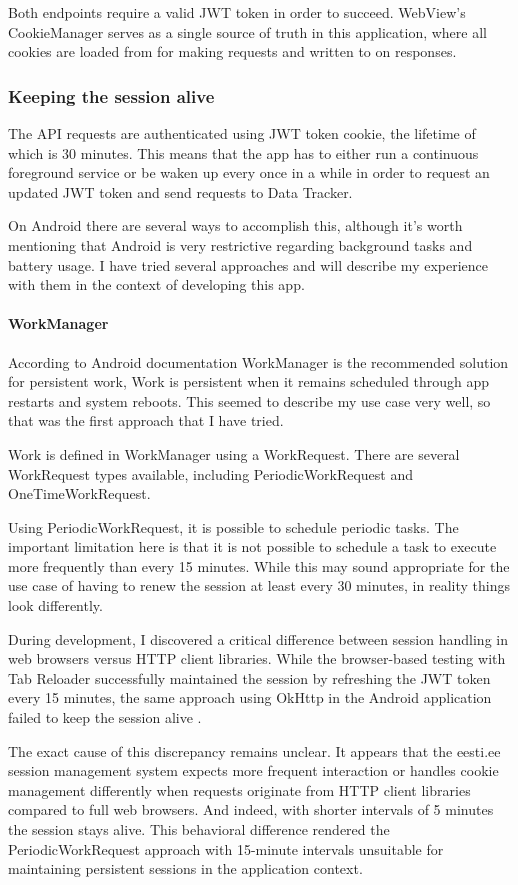 Both endpoints require a valid JWT token in order to succeed. WebView's CookieManager serves as a single source of truth in this application, where all cookies are loaded from for making requests and written to on responses.

\subsubsection{Keeping the session alive}
The API requests are authenticated using JWT token cookie, the lifetime of which is 30 minutes. This means that the app has to either run a continuous foreground service or be waken up every once in a while in order to request an updated JWT token and send requests to Data Tracker.

On Android there are several ways to accomplish this, although it's worth mentioning that Android is very restrictive regarding background tasks and battery usage. I have tried several approaches and will describe my experience with them in the context of developing this app.

\paragraph{WorkManager}
According to Android documentation WorkManager is the recommended solution for persistent work, Work is persistent when it remains scheduled through app restarts and system reboots. This seemed to describe my use case very well, so that was the first approach that I have tried.

Work is defined in WorkManager using a WorkRequest. There are several WorkRequest types available, including PeriodicWorkRequest and OneTimeWorkRequest.

Using PeriodicWorkRequest, it is possible to schedule periodic tasks. The important limitation here is that it is not possible to schedule a task to execute more frequently than every 15 minutes. While this may sound appropriate for the use case of having to renew the session at least every 30 minutes, in reality things look differently.

During development, I discovered a critical difference between session handling in web browsers versus HTTP client libraries. While the browser-based testing with Tab Reloader successfully maintained the session by refreshing the JWT token every 15 minutes, the same approach using OkHttp in the Android application failed to keep the session alive .

The exact cause of this discrepancy remains unclear. It appears that the eesti.ee session management system expects more frequent interaction or handles cookie management differently when requests originate from HTTP client libraries compared to full web browsers. And indeed, with shorter intervals of 5 minutes the session stays alive. This behavioral difference rendered the PeriodicWorkRequest approach with 15-minute intervals unsuitable for maintaining persistent sessions in the application context.

